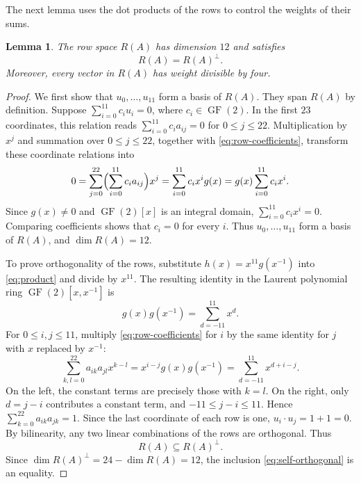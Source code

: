 \documentclass[11pt]{article}
\numberwithin{equation}{section}
\newtheorem{lemma}[lemma]{Lemma}
\DeclareMathOperator{\GF}{GF}
\begin{document}
The next lemma uses the dot products of the rows to control the weights
of their sums.

\begin{lemma}\label{lem:orthogonal}
The row space $R(A)$ has dimension $12$ and satisfies
\[
 R(A)=R(A)^\perp.
\]
Moreover, every vector in $R(A)$ has weight divisible by four.
\end{lemma}

\begin{proof}
We first show that $u_0,\ldots,u_{11}$ form a basis of $R(A)$.
They span $R(A)$ by definition.
Suppose $\sum_{i=0}^{11}c_i u_i=0$, where $c_i\in\GF(2)$.
In the first $23$ coordinates, this relation reads
$\sum_{i=0}^{11}c_i a_{ij}=0$ for $0\leq j\leq22$.
Multiplication by $x^j$ and summation over $0\leq j\leq22$, together with
\eqref{eq:row-coefficients}, transform these coordinate relations into
\[
 0=\sum_{j=0}^{22}\Bigl(\sum_{i=0}^{11}c_i a_{ij}\Bigr)x^j
  =\sum_{i=0}^{11}c_i x^i g(x)
  =g(x)\sum_{i=0}^{11}c_i x^i.
\]
Since $g(x)\ne0$ and $\GF(2)[x]$ is an integral domain,
$\sum_{i=0}^{11}c_i x^i=0$. Comparing coefficients shows that
$c_i=0$ for every $i$.
Thus $u_0,\ldots,u_{11}$ form a basis of $R(A)$, and $\dim R(A)=12$.

To prove orthogonality of the rows, substitute $h(x)=x^{11}g(x^{-1})$ into
\eqref{eq:product} and divide by $x^{11}$. The resulting identity in the
Laurent polynomial ring $\GF(2)[x,x^{-1}]$ is
\[
 g(x)g(x^{-1})=\sum_{d=-11}^{11}x^d.
\]
For $0\leq i,j\leq11$, multiply \eqref{eq:row-coefficients} for $i$
by the same identity for $j$ with $x$ replaced by $x^{-1}$:
\[
 \sum_{k,l=0}^{22}a_{ik}a_{jl}x^{k-l}
 =x^{i-j}g(x)g(x^{-1})
 =\sum_{d=-11}^{11}x^{d+i-j}.
\]
On the left, the constant terms are precisely those with $k=l$.
On the right, only $d=j-i$ contributes a constant term, and
$-11\leq j-i\leq11$.
Hence $\sum_{k=0}^{22}a_{ik}a_{jk}=1$. Since the last coordinate of each row is one,
$u_i\cdot u_j=1+1=0$.
By bilinearity, any two linear combinations of the rows are orthogonal.
Thus
\begin{equation}\label{eq:self-orthogonal}
 R(A)\subseteq R(A)^\perp.
\end{equation}
Since $\dim R(A)^\perp=24-\dim R(A)=12$, the inclusion
\eqref{eq:self-orthogonal} is an equality.


\end{proof}
\end{document}

